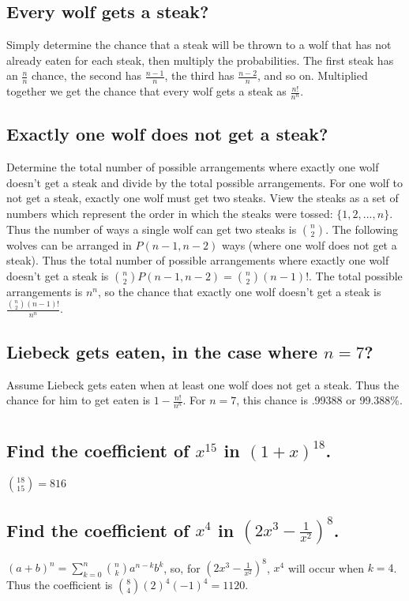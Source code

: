 \documentclass[12pt]{article}
\begin{document}
\subsection{Every wolf gets a steak?}
Simply determine the chance that a steak will be thrown to a wolf that has not already eaten for each steak, then multiply the probabilities.
The first steak has an $\frac{n}{n}$ chance, the second has $\frac{n-1}{n}$, the third has $\frac{n-2}{n}$, and so on.
Multiplied together we get the chance that every wolf gets a steak as $\frac{n!}{n^n}$.

\subsection{Exactly one wolf does not get a steak?}
Determine the total number of possible arrangements where exactly one wolf doesn't get a steak and divide by the total possible arrangements.
For one wolf to not get a steak, exactly one wolf must get two steaks. View the steaks as a set of numbers which represent the order in which the steaks were tossed:
$\{1,2,...,n\}$. Thus the number of ways a single wolf can get two steaks is $\binom{n}{2}$.
The following wolves can be arranged in $P(n-1,n-2)$ ways (where one wolf does not get a steak).
Thus the total number of possible arrangements where exactly one wolf doesn't get a steak is $\binom{n}{2} P(n-1,n-2) = \binom{n}{2} (n-1)!$.
The total possible arrangements is $n^n$, so the chance that exactly one wolf doesn't get a steak is $\frac{\binom{n}{2} (n-1)!}{n^n}$.

\subsection{Liebeck gets eaten, in the case where $n=7$?}
Assume Liebeck gets eaten when at least one wolf does not get a steak. Thus the chance for him to get eaten is $1-\frac{n!}{n^n}$.
For $n=7$, this chance is .99388 or 99.388\%. 

\setcounter{section}{12}

\section{}
\subsection{Find the coefficient of $x^{15}$ in $(1+x)^{18}$.}
$\binom{18}{15} = 816$

\subsection{Find the coefficient of $x^4$ in $(2x^3 - \frac{1}{x^2})^8$.}
$(a+b)^n = \sum_{k=0}^{n} \binom{n}{k} a^{n-k} b^k$, so, for $(2x^3 - \frac{1}{x^2})^8$,
$x^4$ will occur when $k=4$. Thus the coefficient is $\binom{8}{4}(2)^4(-1)^4 = 1120$.
\end{document}
